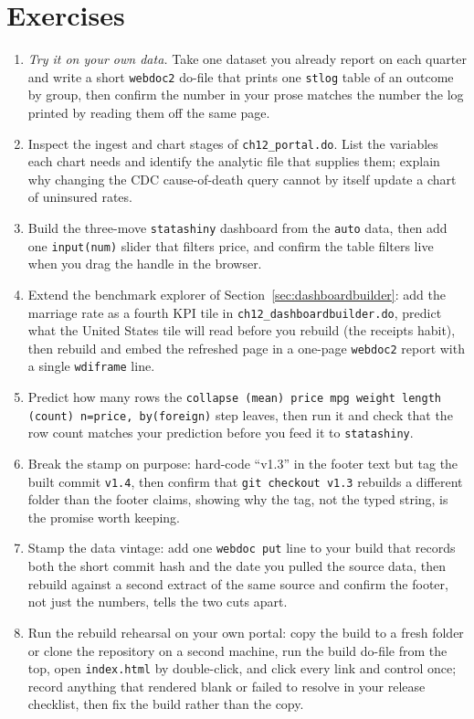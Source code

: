 \section*{Exercises}
\begin{enumerate}
\item \emph{Try it on your own data.} Take one dataset you already report on each quarter and write a short \texttt{webdoc2} do-file that prints one \texttt{stlog} table of an outcome by group, then confirm the number in your prose matches the number the log printed by reading them off the same page.
\item Inspect the ingest and chart stages of \texttt{ch12\_portal.do}. List the variables each chart needs and identify the analytic file that supplies them; explain why changing the CDC cause-of-death query cannot by itself update a chart of uninsured rates.
\item Build the three-move \texttt{statashiny} dashboard from the \texttt{auto} data, then add one \texttt{input(num)} slider that filters price, and confirm the table filters live when you drag the handle in the browser.
\item Extend the benchmark explorer of Section~\ref{sec:dashboardbuilder}: add the marriage rate as a fourth KPI tile in \texttt{ch12\_dashboardbuilder.do}, predict what the United States tile will read before you rebuild (the receipts habit), then rebuild and embed the refreshed page in a one-page \texttt{webdoc2} report with a single \texttt{wdiframe} line.
\item Predict how many rows the \texttt{collapse (mean) price mpg weight length (count) n=price, by(foreign)} step leaves, then run it and check that the row count matches your prediction before you feed it to \texttt{statashiny}.
\item Break the stamp on purpose: hard-code \enquote{v1.3} in the footer text but tag the built commit \texttt{v1.4}, then confirm that \texttt{git checkout v1.3} rebuilds a different folder than the footer claims, showing why the tag, not the typed string, is the promise worth keeping.
\item Stamp the data vintage: add one \texttt{webdoc put} line to your build that records both the short commit hash and the date you pulled the source data, then rebuild against a second extract of the same source and confirm the footer, not just the numbers, tells the two cuts apart.
\item Run the rebuild rehearsal on your own portal: copy the build to a fresh folder or clone the repository on a second machine, run the build do-file from the top, open \texttt{index.html} by double-click, and click every link and control once; record anything that rendered blank or failed to resolve in your release checklist, then fix the build rather than the copy.
\end{enumerate}
